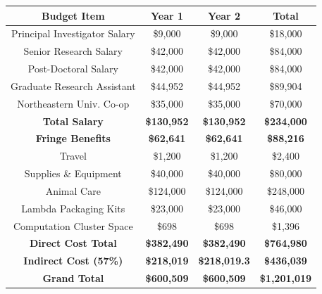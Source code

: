 \documentclass[12pt]{article}
\begin{document}
\begin{table}[h]
\centering
\begin{tabular}{|c|c|c|c|}
\hline
\textbf{Budget Item}          & \textbf{Year 1}    & \textbf{Year 2}    & \textbf{Total}     \\ \hline
Principal Investigator Salary & \$9,000            & \$9,000            & \$18,000           \\ \hline
Senior Research Salary        & \$42,000           & \$42,000           & \$84,000           \\ \hline
Post-Doctoral Salary          & \$42,000           & \$42,000           & \$84,000           \\ \hline
Graduate Research Assistant   & \$44,952           & \$44,952           & \$89,904           \\ \hline
Northeastern Univ. Co-op      & \$35,000           & \$35,000           & \$70,000           \\ \hline
\textbf{Total Salary}         & \textbf{\$130,952} & \textbf{\$130,952} & \textbf{\$234,000} \\ \hline
\textbf{Fringe Benefits}      & \textbf{\$62,641}  & \textbf{\$62,641}  & \textbf{\$88,216}  \\ \hline
Travel                        & \$1,200            & \$1,200            & \$2,400            \\ \hline
Supplies \& Equipment         & \$40,000           & \$40,000           & \$80,000           \\ \hline
Animal Care                   & \$124,000          & \$124,000          & \$248,000          \\ \hline
Lambda Packaging Kits         & \$23,000           & \$23,000           & \$46,000           \\ \hline
Computation Cluster Space     & \$698              & \$698              & \$1,396            \\ \hline
\textbf{Direct Cost Total}    & \textbf{\$382,490} & \textbf{\$382,490} & \textbf{\$764,980} \\ \hline
\textbf{Indirect Cost (57\%)} & \textbf{\$218,019}  & \textbf{\$218,019.3}  & \textbf{\$436,039} \\ \hline \hline
\textbf{Grand Total}          & \textbf{\$600,509} & \textbf{\$600,509} & \textbf{\$1,201,019}          \\ \hline
\end{tabular}
\end{table}
\end{document}

